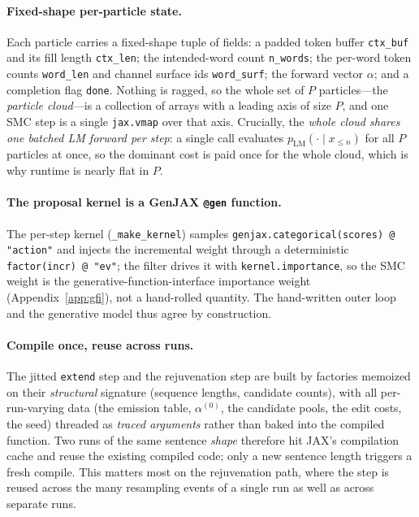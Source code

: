 \documentclass[11pt]{article}
\providecommand{\given}{\mid}
\providecommand{\pLM}{p_{\mathrm{LM}}}
\providecommand{\code}[1]{\texttt{#1}}
\begin{document}
\paragraph{Fixed-shape per-particle state.} Each particle carries a fixed-shape tuple of fields: a padded token buffer \code{ctx\_buf} and its fill length \code{ctx\_len}; the intended-word count \code{n\_words}; the per-word token counts \code{word\_len} and channel surface ids \code{word\_surf}; the forward vector $\alpha$; and a completion flag \code{done}. Nothing is ragged, so the whole set of $P$ particles---the \emph{particle cloud}---is a collection of arrays with a leading axis of size $P$, and one SMC step is a single \code{jax.vmap} over that axis. Crucially, the \emph{whole cloud shares one batched LM forward per step}: a single call evaluates $\pLM(\cdot\given x_{\le n})$ for all $P$ particles at once, so the dominant cost is paid once for the whole cloud, which is why runtime is nearly flat in $P$.

\paragraph{The proposal kernel is a GenJAX \code{@gen} function.} The per-step kernel (\code{\_make\_kernel}) samples \code{genjax.categorical(scores) @ "action"} and injects the incremental weight through a deterministic \code{factor(incr) @ "ev"}; the filter drives it with \code{kernel.importance}, so the SMC weight is the generative-function-interface importance weight (Appendix~\ref{app:gfi}), not a hand-rolled quantity. The hand-written outer loop and the generative model thus agree by construction.

\paragraph{Compile once, reuse across runs.} The jitted \code{extend} step and the rejuvenation step are built by factories memoized on their \emph{structural} signature (sequence lengths, candidate counts), with all per-run-varying data (the emission table, $\alpha^{(0)}$, the candidate pools, the edit costs, the seed) threaded as \emph{traced arguments} rather than baked into the compiled function. Two runs of the same sentence \emph{shape} therefore hit JAX's compilation cache and reuse the existing compiled code; only a new sentence length triggers a fresh compile. This matters most on the rejuvenation path, where the step is reused across the many resampling events of a single run as well as across separate runs.
\end{document}
